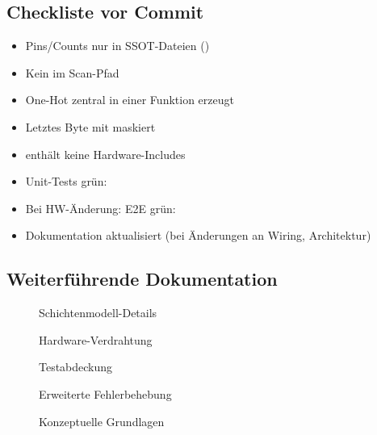 \subsection{Checkliste vor Commit}

\begin{itemize}
\item[$\square$] Pins/Counts nur in SSOT-Dateien ()
\item[$\square$] Kein  im Scan-Pfad
\item[$\square$] One-Hot zentral in einer Funktion erzeugt
\item[$\square$] Letztes Byte mit  maskiert
\item[$\square$]  enthält keine Hardware-Includes
\item[$\square$] Unit-Tests grün: 
\item[$\square$] Bei HW-Änderung: E2E grün: 
\item[$\square$] Dokumentation aktualisiert (bei Änderungen an Wiring, Architektur)
\end{itemize}

\subsection{Weiterführende Dokumentation}

\begin{description}
\item[] Schichtenmodell-Details
\item[] Hardware-Verdrahtung
\item[] Testabdeckung
\item[] Erweiterte Fehlerbehebung
\item[] Konzeptuelle Grundlagen
\end{description}
